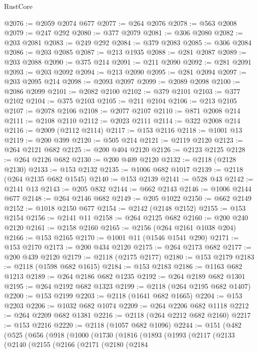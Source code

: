 \begin{lexlean}{RustCore}
\begin{coremodule}
@2076 := @2059 @2074 @677
@2077 := @264 @2076
@2078 := @563 @2008
@2079 := @247 @292
@2080 := @377 @2079
@2081 := @306 @2080
@2082 := @203 @2081
@2083 := @249 @292
@2084 := @379 @2083
@2085 := @306 @2084
@2086 := @203 @2085
@2087 := @213 @1935
@2088 := @281 @2087
@2089 := @203 @2088
@2090 := @375 @214
@2091 := @211 @2090
@2092 := @281 @2091
@2093 := @203 @2092
@2094 := @213 @2090
@2095 := @281 @2094
@2097 := @203 @2095 @214
@2098 := @2093 @2097
@2099 := @2089 @2098
@2100 := @2086 @2099
@2101 := @2082 @2100
@2102 := @379 @2101
@2103 := @377 @2102
@2104 := @375 @2103
@2105 := @211 @2104
@2106 := @213 @2105
@2107 := @2078 @2106
@2108 := @2077 @2107
@2110 := @871 @2008 @214
@2111 := @2108 @2110
@2112 := @2023 @2111
@2114 := @322 @2008 @214
@2116 := @2009 (@2112 @2114)
@2117 := @153 @2116
@2118 := @1001 @13
@2119 := @200 @399
@2120 := @505 @214
@2121 := @2119 @2120
@2123 := @264 @2121 @682
@2125 := @200 @404 @2120
@2126 := @2123 @2125
@2128 := @264 @2126 @682
@2130 := @200 @409 @2120
@2132 := @2118 (@2128 @2130)
@2133 := @153 @2132
@2135 := @1006 @682 @1017
@2139 := @2118 (@264 @2135 @682 @1545)
@2140 := @153 @2139
@2141 := @528 @43
@2142 := @2141 @13
@2143 := @205 @832
@2144 := @662 @2143
@2146 := @1006 @2144 @677
@2148 := @264 @2146 @682
@2149 := @205 @1022
@2150 := @662 @2149
@2152 := @1018 @2150 @677
@2154 := @2142 (@2148 @2152)
@2155 := @153 @2154
@2156 := @2141 @11
@2158 := @264 @2125 @682
@2160 := @200 @240 @2120
@2161 := @2158 @2160
@2165 := @2156 (@264 @2161 @1038 @204)
@2166 := @153 @2165
@2170 := @1001 @11 (@1546 @1541 @290)
@2171 := @153 @2170
@2173 := @200 @434 @2120
@2175 := @264 @2173 @682
@2177 := @200 @439 @2120
@2179 := @2118 (@2175 @2177)
@2180 := @153 @2179
@2183 := @2118 (@1598 @682 @1615)
@2184 := @153 @2183
@2186 := @1163 @682 @1213
@2189 := @264 @2186 @682 @1235
@2192 := @264 @2189 @682 @1301
@2195 := @264 @2192 @682 @1323
@2199 := @2118 (@264 @2195 @682 @1407)
@2200 := @153 @2199
@2203 := @2118 (@1641 @682 @1665)
@2204 := @153 @2203
@2206 := @1032 @682 @1074
@2209 := @264 @2206 @682 @1118
@2212 := @264 @2209 @682 @1381
@2216 := @2118 (@264 @2212 @682 @2160)
@2217 := @153 @2216
@2220 := @2118 (@1057 @682 @1096)
@2244 := @151
    (@482
      (@525
        (@656
          (@918
            (@1000
              (@1730
                (@1816
                  (@1893
                    (@1993
                      (@2117
                        (@2133
                          (@2140
                            (@2155
                              (@2166
                                (@2171
                                  (@2180
                                    (@2184

\end{coremodule}
\end{lexlean}
